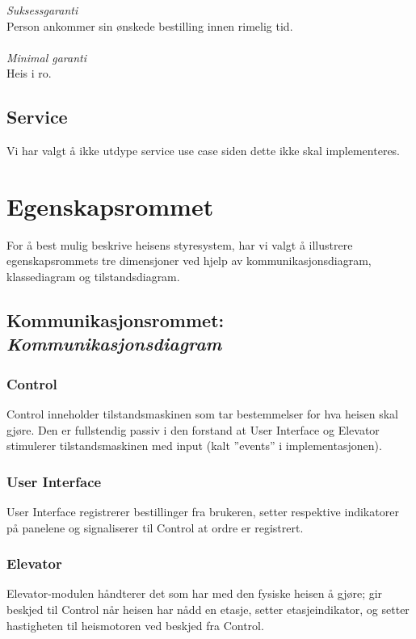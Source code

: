 \documentclass[language=norsk]{ezreport}
\begin{document}
\emph{Suksessgaranti}\\
Person ankommer sin ønskede bestilling innen rimelig tid.\\\\
\emph{Minimal garanti}\\
Heis i ro.

\subsection*{Service}
Vi har valgt å ikke utdype service use case siden dette ikke skal implementeres.

\section*{Egenskapsrommet}
For å best mulig beskrive heisens styresystem, har vi valgt å illustrere egenskapsrommets tre dimensjoner ved hjelp av kommunikasjonsdiagram, klassediagram og tilstandsdiagram. 


\subsection*{Kommunikasjonsrommet: \emph{Kommunikasjonsdiagram}}
\subsubsection*{Control}
Control inneholder tilstandsmaskinen som tar bestemmelser for hva heisen skal gjøre. Den er fullstendig passiv i den forstand at User Interface og Elevator stimulerer tilstandsmaskinen med input (kalt ''events'' i implementasjonen).

\subsubsection*{User Interface}
User Interface registrerer bestillinger fra brukeren, setter respektive indikatorer på panelene og signaliserer til Control at ordre er registrert.

\subsubsection*{Elevator}
Elevator-modulen håndterer det som har med den fysiske heisen å gjøre; gir beskjed til Control når heisen har nådd en etasje, setter etasjeindikator, og setter hastigheten til heismotoren ved beskjed fra Control.
\end{document}
